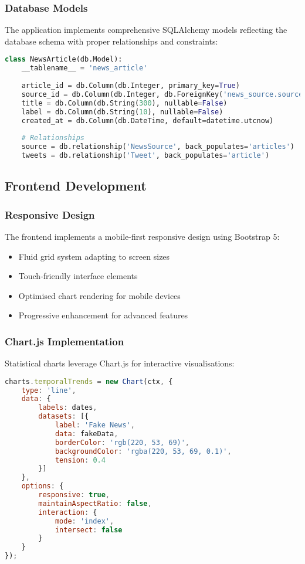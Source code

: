 \documentclass[12pt,a4paper]{article}
\begin{document}
\subsubsection{Database Models}
The application implements comprehensive SQLAlchemy models reflecting the database schema with proper relationships and constraints:

\begin{lstlisting}[language=Python, caption=Example Model Definition]
class NewsArticle(db.Model):
    __tablename__ = 'news_article'
    
    article_id = db.Column(db.Integer, primary_key=True)
    source_id = db.Column(db.Integer, db.ForeignKey('news_source.source_id'))
    title = db.Column(db.String(300), nullable=False)
    label = db.Column(db.String(10), nullable=False)
    created_at = db.Column(db.DateTime, default=datetime.utcnow)
    
    # Relationships
    source = db.relationship('NewsSource', back_populates='articles')
    tweets = db.relationship('Tweet', back_populates='article')
\end{lstlisting}

\subsection{Frontend Development}

\subsubsection{Responsive Design}
The frontend implements a mobile-first responsive design using Bootstrap 5:
\begin{itemize}
    \item Fluid grid system adapting to screen sizes
    \item Touch-friendly interface elements
    \item Optimised chart rendering for mobile devices
    \item Progressive enhancement for advanced features
\end{itemize}

\subsubsection{Chart.js Implementation}
Statistical charts leverage Chart.js for interactive visualisations:

\begin{lstlisting}[language=JavaScript, caption=Chart Configuration Example]
charts.temporalTrends = new Chart(ctx, {
    type: 'line',
    data: {
        labels: dates,
        datasets: [{
            label: 'Fake News',
            data: fakeData,
            borderColor: 'rgb(220, 53, 69)',
            backgroundColor: 'rgba(220, 53, 69, 0.1)',
            tension: 0.4
        }]
    },
    options: {
        responsive: true,
        maintainAspectRatio: false,
        interaction: {
            mode: 'index',
            intersect: false
        }
    }
});
\end{lstlisting}
\end{document}
